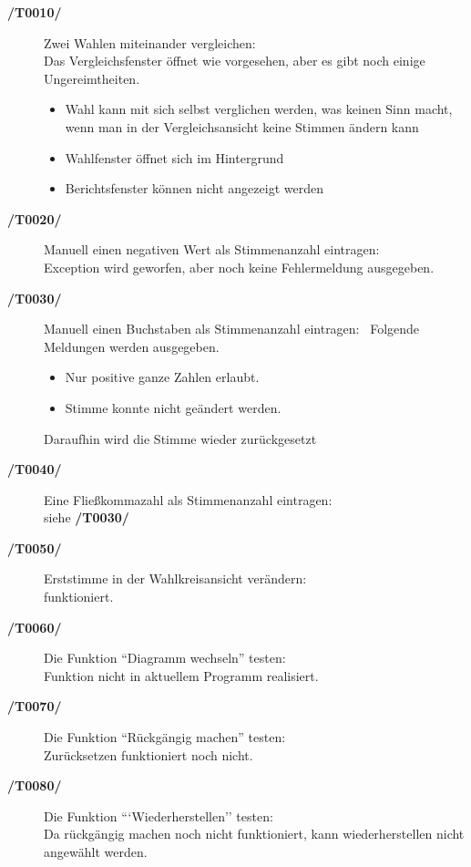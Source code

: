 \documentclass[12pt,a4paper,titlepage]{article}
\begin{document}
\begin{description}
	\item[\textbf{/T0010/}] Zwei Wahlen miteinander vergleichen: \\
	Das Vergleichsfenster öffnet wie vorgesehen, aber es gibt noch einige Ungereimtheiten.
	
	\begin{itemize}
	\item Wahl kann mit sich selbst verglichen werden, was keinen Sinn macht, wenn man in der Vergleichsansicht keine Stimmen ändern kann
	\item Wahlfenster öffnet sich im Hintergrund
	\item Berichtsfenster können nicht angezeigt werden
	\end{itemize}
	
	\item[\textbf{/T0020/}] Manuell einen negativen Wert als Stimmenanzahl eintragen: \\
	Exception wird geworfen, aber noch keine Fehlermeldung ausgegeben.
	\item[\textbf{/T0030/}] Manuell einen Buchstaben als Stimmenanzahl eintragen: \
	Folgende Meldungen werden ausgegeben.
	\begin{itemize}
	\item Nur positive ganze Zahlen erlaubt.
	\item Stimme konnte nicht geändert werden.
	\end{itemize}
	Daraufhin wird die Stimme wieder zurückgesetzt
	\item[\textbf{/T0040/}] Eine Fließkommazahl als Stimmenanzahl eintragen: \\
	siehe \textbf{/T0030/}
	\item[\textbf{/T0050/}] Erststimme in der Wahlkreisansicht verändern: \\
	funktioniert.
	\item[\textbf{/T0060/}] Die Funktion ``Diagramm wechseln'' testen:\\
	Funktion nicht in aktuellem Programm realisiert.
	\item[\textbf{/T0070/}] Die Funktion ``Rückgängig machen'' testen: \\
	Zurücksetzen funktioniert noch nicht.
	\item[\textbf{/T0080/}] Die Funktion ```Wiederherstellen'' testen: \\
Da rückgängig machen noch nicht funktioniert, kann wiederherstellen nicht angewählt werden.
\end{description}
\end{document}
